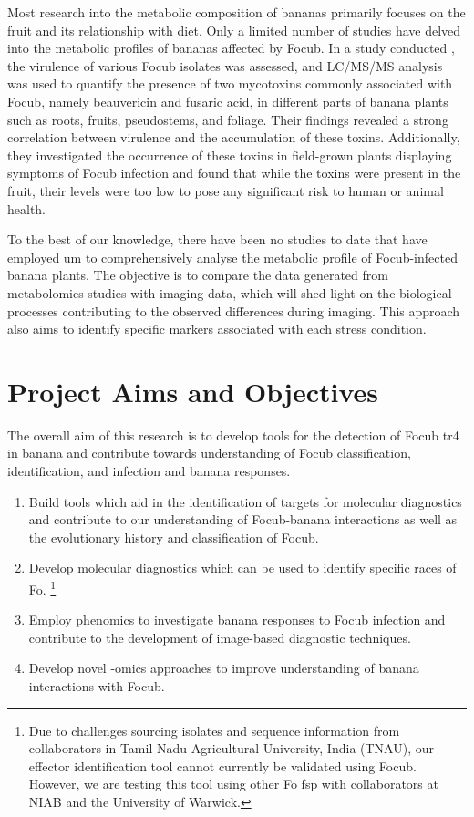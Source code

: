 Most research into the metabolic composition of bananas primarily focuses on the fruit and its relationship with diet. Only a limited number of studies have delved into the metabolic profiles of bananas affected by \ac{Focub}. In a study conducted \textcite{Li2013c}, the virulence of various \ac{Focub} isolates was assessed, and LC/MS/MS analysis was used to quantify the presence of two mycotoxins commonly associated with \ac{Focub}, namely beauvericin and fusaric acid, in different parts of banana plants such as roots, fruits, pseudostems, and foliage. Their findings revealed a strong correlation between virulence and the accumulation of these toxins. Additionally, they investigated the occurrence of these toxins in field-grown plants displaying symptoms of \ac{Focub} infection and found that while the toxins were present in the fruit, their levels were too low to pose any significant risk to human or animal health.

To the best of our knowledge, there have been no studies to date that have employed \ac{um} to comprehensively analyse the metabolic profile of \ac{Focub}-infected banana plants. The objective is to compare the data generated from metabolomics studies with imaging data, which will shed light on the biological processes contributing to the observed differences during imaging. This approach also aims to identify specific markers associated with each stress condition. 

\newpage
\section{Project Aims and Objectives}

The overall aim of this research is to develop tools for the detection of \acl{Focub} \ac{tr4} in banana and contribute towards understanding of \acl{Focub} classification, identification, and infection and banana responses. 

\begin{enumerate}
    \item Build tools which aid in the identification of targets for molecular diagnostics and contribute to our understanding of \ac{Focub}-banana interactions as well as the evolutionary history and classification of \ac{Focub}. 
    \item Develop molecular diagnostics which can be used to identify specific races of \acl{Fo}. \footnote{Due to challenges sourcing isolates and sequence information from collaborators in Tamil Nadu Agricultural University, India (TNAU), our effector identification tool cannot currently be validated using \ac{Focub}. However, we are testing this tool using other \acl{Fo} \ac{fsp} with collaborators at NIAB and the University of Warwick.}
    \item Employ phenomics to investigate banana responses to \ac{Focub} infection and contribute to the development of image-based diagnostic techniques.  
    \item Develop novel -omics approaches to improve understanding of banana interactions with \ac{Focub}.  
\end{enumerate}


